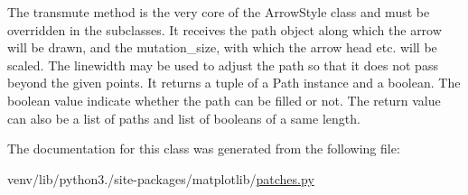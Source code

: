 \begin{DoxyVerb}The transmute method is the very core of the ArrowStyle class and
must be overridden in the subclasses. It receives the path object
along which the arrow will be drawn, and the mutation_size, with
which the arrow head etc. will be scaled. The linewidth may be
used to adjust the path so that it does not pass beyond the given
points. It returns a tuple of a Path instance and a boolean. The
boolean value indicate whether the path can be filled or not. The
return value can also be a list of paths and list of booleans of a
same length.
\end{DoxyVerb}
 

The documentation for this class was generated from the following file\+:\begin{DoxyCompactItemize}
\item 
venv/lib/python3./site-\/packages/matplotlib/\hyperlink{patches_8py}{patches.\+py}\end{DoxyCompactItemize}
